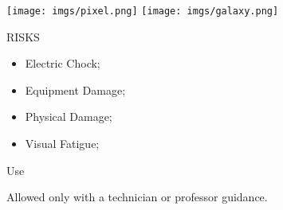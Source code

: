 \begin{multicols}{2}

\texttt{[image: imgs/pixel.png]}
\texttt{[image: imgs/galaxy.png]}


\columnbreak

\begin{mdframed}[roundcorner=10pt, linecolor=red, linewidth=2pt]
\vspace{1em}
{\Large {\color{red}RISKS}}
\vspace{1em}

\begin{itemize}
    \item Electric Chock;
    \item Equipment Damage;
    \item Physical Damage;
    \item Visual Fatigue; 
\end{itemize}

\vspace{1em}
\end{mdframed}

\vspace{2em}

{\Large Use}
\vspace{1em}

Allowed only with a technician or professor guidance.
\end{multicols}
\newpage
